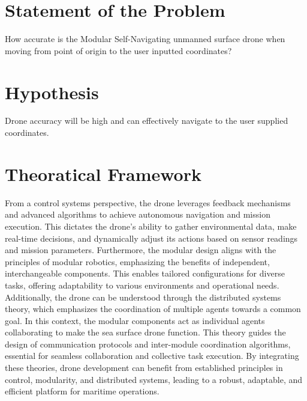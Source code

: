 \section{Statement of the Problem}
 How accurate is the Modular Self-Navigating unmanned surface drone when moving from point of origin to the user inputted coordinates?

\section{Hypothesis}
 Drone accuracy will be high and can effectively navigate to the user supplied coordinates.

\section{Theoratical Framework}
From a control systems perspective, the drone leverages feedback mechanisms and advanced algorithms to achieve autonomous navigation and 
mission execution. This dictates the drone's ability to gather environmental data, make real-time decisions, and dynamically adjust its 
actions based on sensor readings and mission parameters. Furthermore, the modular design aligns with the principles of modular robotics, 
emphasizing the benefits of independent, interchangeable components. This enables tailored configurations for diverse tasks, offering 
adaptability to various environments and operational needs. Additionally, the drone can be understood through the distributed systems theory, 
which emphasizes the coordination of multiple agents towards a common goal. In this context, the modular components act as individual agents 
collaborating to make the sea surface drone function. This theory guides the design of communication protocols and inter-module coordination 
algorithms, essential for seamless collaboration and collective task execution. By integrating these theories, drone development can benefit 
from established principles in control, modularity, and distributed systems, leading to a robust, adaptable, and efficient platform for maritime 
operations.

